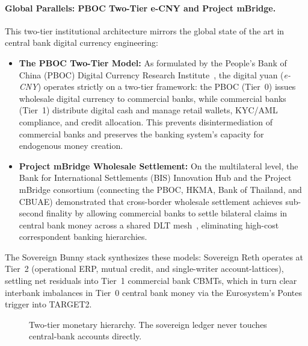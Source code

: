 \documentclass[a4paper,11pt,twoside,parskip=half-,headings=small]{scrartcl}
\begin{document}
\paragraph{Global Parallels: PBOC Two-Tier e-CNY and Project mBridge.}
This two-tier institutional architecture mirrors the global state of the art in central bank digital currency engineering:
\begin{itemize}
  \item \textbf{The PBOC Two-Tier Model:} As formulated by the People's Bank of China (PBOC) Digital Currency Research Institute~\cite{pboc2021ecny}, the digital yuan (\emph{e-CNY}) operates strictly on a two-tier framework: the PBOC (Tier~0) issues wholesale digital currency to commercial banks, while commercial banks (Tier~1) distribute digital cash and manage retail wallets, KYC/AML compliance, and credit allocation. This prevents disintermediation of commercial banks and preserves the banking system's capacity for endogenous money creation.
  \item \textbf{Project mBridge Wholesale Settlement:} On the multilateral level, the Bank for International Settlements (BIS) Innovation Hub and the Project mBridge consortium (connecting the PBOC, HKMA, Bank of Thailand, and CBUAE) demonstrated that cross-border wholesale settlement achieves sub-second finality by allowing commercial banks to settle bilateral claims in central bank money across a shared DLT mesh~\cite{bis2024mbridge}, eliminating high-cost correspondent banking hierarchies.
\end{itemize}
The Sovereign Bunny stack synthesizes these models: Sovereign Reth operates at Tier~2 (operational ERP, mutual credit, and single-writer account-lattices), settling net residuals into Tier~1 commercial bank CBMTs, which in turn clear interbank imbalances in Tier~0 central bank money via the Eurosystem's Pontes trigger into TARGET2.

\begin{figure}[H]
\centering
{}
\caption{Two-tier monetary hierarchy. The sovereign ledger never touches central-bank accounts directly.}
\label{fig:tiers}
\end{figure}
\end{document}
